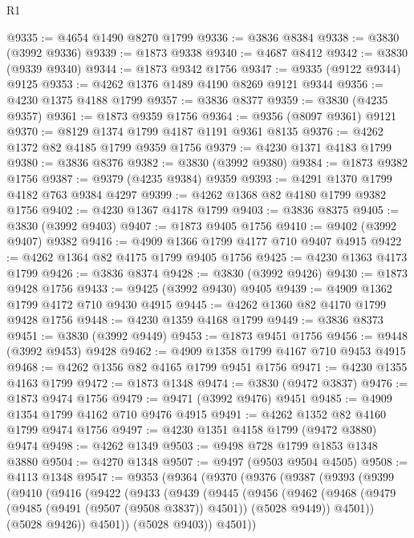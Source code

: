 \begin{lexlean}{R1}
\begin{coremodule}
@9335 := @4654 @1490 @8270 @1799
@9336 := @3836 @8384
@9338 := @3830 (@3992 @9336)
@9339 := @1873 @9338
@9340 := @4687 @8412
@9342 := @3830 (@9339 @9340)
@9344 := @1873 @9342 @1756
@9347 := @9335 (@9122 @9344) @9125
@9353 := @4262 @1376 @1489 @4190 @8269 @9121 @9344
@9356 := @4230 @1375 @4188 @1799
@9357 := @3836 @8377
@9359 := @3830 (@4235 @9357)
@9361 := @1873 @9359 @1756
@9364 := @9356 (@8097 @9361) @9121
@9370 := @8129 @1374 @1799 @4187 @1191 @9361 @8135
@9376 := @4262 @1372 @82 @4185 @1799 @9359 @1756
@9379 := @4230 @1371 @4183 @1799
@9380 := @3836 @8376
@9382 := @3830 (@3992 @9380)
@9384 := @1873 @9382 @1756
@9387 := @9379 (@4235 @9384) @9359
@9393 := @4291 @1370 @1799 @4182 @763 @9384 @4297
@9399 := @4262 @1368 @82 @4180 @1799 @9382 @1756
@9402 := @4230 @1367 @4178 @1799
@9403 := @3836 @8375
@9405 := @3830 (@3992 @9403)
@9407 := @1873 @9405 @1756
@9410 := @9402 (@3992 @9407) @9382
@9416 := @4909 @1366 @1799 @4177 @710 @9407 @4915
@9422 := @4262 @1364 @82 @4175 @1799 @9405 @1756
@9425 := @4230 @1363 @4173 @1799
@9426 := @3836 @8374
@9428 := @3830 (@3992 @9426)
@9430 := @1873 @9428 @1756
@9433 := @9425 (@3992 @9430) @9405
@9439 := @4909 @1362 @1799 @4172 @710 @9430 @4915
@9445 := @4262 @1360 @82 @4170 @1799 @9428 @1756
@9448 := @4230 @1359 @4168 @1799
@9449 := @3836 @8373
@9451 := @3830 (@3992 @9449)
@9453 := @1873 @9451 @1756
@9456 := @9448 (@3992 @9453) @9428
@9462 := @4909 @1358 @1799 @4167 @710 @9453 @4915
@9468 := @4262 @1356 @82 @4165 @1799 @9451 @1756
@9471 := @4230 @1355 @4163 @1799
@9472 := @1873 @1348
@9474 := @3830 (@9472 @3837)
@9476 := @1873 @9474 @1756
@9479 := @9471 (@3992 @9476) @9451
@9485 := @4909 @1354 @1799 @4162 @710 @9476 @4915
@9491 := @4262 @1352 @82 @4160 @1799 @9474 @1756
@9497 := @4230 @1351 @4158 @1799 (@9472 @3880) @9474
@9498 := @4262 @1349
@9503 := @9498 @728 @1799 @1853 @1348 @3880
@9504 := @4270 @1348
@9507 := @9497 (@9503 @9504 @4505)
@9508 := @4113 @1348
@9547 := @9353
    (@9364
      (@9370
        (@9376
          (@9387
            (@9393
              (@9399
                (@9410
                  (@9416
                    (@9422
                      (@9433
                        (@9439
                          (@9445
                            (@9456
                              (@9462
                                (@9468
                                  (@9479 (@9485 (@9491 (@9507 (@9508 @3837)) @4501)) (@5028 @9449))
                                  @4501))
                              (@5028 @9426))
                            @4501))
                        (@5028 @9403))
                      @4501))

\end{coremodule}
\end{lexlean}
